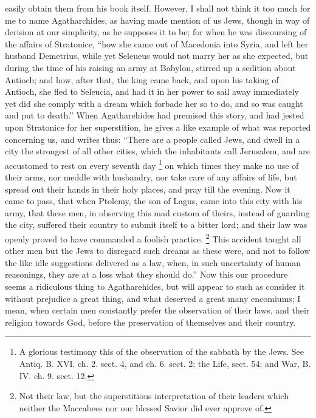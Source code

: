 easily obtain them from his book itself. However, I shall not think it too
much for me to name Agatharchides, as having made mention of us Jews,
though in way of derision at our simplicity, as he supposes it to be; for
when he was discoursing of the affairs of Stratonice, ``how she came out of
Macedonia into Syria, and left her husband Demetrius, while yet Seleueus
would not marry her as she expected, but during the time of his raising an
army at Babylon, stirred up a sedition about Antioch; and how, after that,
the king came back, and upon his taking of Antioch, she fled to Seleucia,
and had it in her power to sail away immediately yet did she comply with a
dream which forbade her so to do, and so was caught and put to death.''
When Agatharehides had premised this story, and had jested upon Stratonice
for her superstition, he gives a like example of what was reported
concerning us, and writes thus: ``There are a people called Jews, and dwell
in a city the strongest of all other cities, which the inhabitants call
Jerusalem, and are accustomed to rest on every seventh day \footnote{A glorious testimony this
of the observation of the sabbath by the Jews. See Antiq. B. XVI. ch. 2.
sect. 4, and ch. 6. sect. 2; the Life, sect. 54; and War, B. IV. ch. 9.
sect. 12.}
on which times they make no use of their arms, nor meddle with husbandry,
nor take care of any affairs of life, but spread out their hands in their
holy places, and pray till the evening. Now it came to pass, that when
Ptolemy, the son of Lagus, came into this city with his army, that these
men, in observing this mad custom of theirs, instead of guarding the city,
suffered their country to submit itself to a bitter lord; and their law
was openly proved to have commanded a foolish practice. \footnote{Not their law, but the
superstitious interpretation of their leaders which neither the Maccabees
nor our blessed Savior did ever approve of.}
This accident taught all other men but the Jews to disregard such dreams
as these were, and not to follow the like idle suggestions delivered as a
law, when, in such uncertainty of human reasonings, they are at a loss
what they should do.'' Now this our procedure seems a ridiculous thing to
Agatharehides, but will appear to such as consider it without prejudice a
great thing, and what deserved a great many encomiums; I mean, when
certain men constantly prefer the observation of their laws, and their
religion towards God, before the preservation of themselves and their
country.


